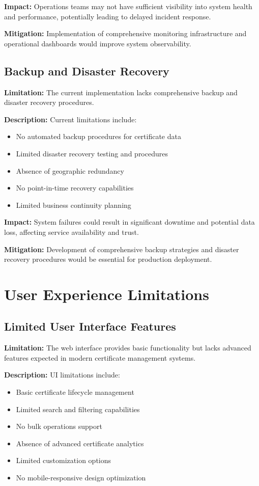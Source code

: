 \textbf{Impact:} Operations teams may not have sufficient visibility into system health and performance, potentially leading to delayed incident response.

\textbf{Mitigation:} Implementation of comprehensive monitoring infrastructure and operational dashboards would improve system observability.

\subsection{Backup and Disaster Recovery}

\textbf{Limitation:} The current implementation lacks comprehensive backup and disaster recovery procedures.

\textbf{Description:} Current limitations include:
\begin{itemize}
    \item No automated backup procedures for certificate data
    \item Limited disaster recovery testing and procedures
    \item Absence of geographic redundancy
    \item No point-in-time recovery capabilities
    \item Limited business continuity planning
\end{itemize}

\textbf{Impact:} System failures could result in significant downtime and potential data loss, affecting service availability and trust.

\textbf{Mitigation:} Development of comprehensive backup strategies and disaster recovery procedures would be essential for production deployment.

\section{User Experience Limitations}

\subsection{Limited User Interface Features}

\textbf{Limitation:} The web interface provides basic functionality but lacks advanced features expected in modern certificate management systems.

\textbf{Description:} UI limitations include:
\begin{itemize}
    \item Basic certificate lifecycle management
    \item Limited search and filtering capabilities
    \item No bulk operations support
    \item Absence of advanced certificate analytics
    \item Limited customization options
    \item No mobile-responsive design optimization
\end{itemize}

